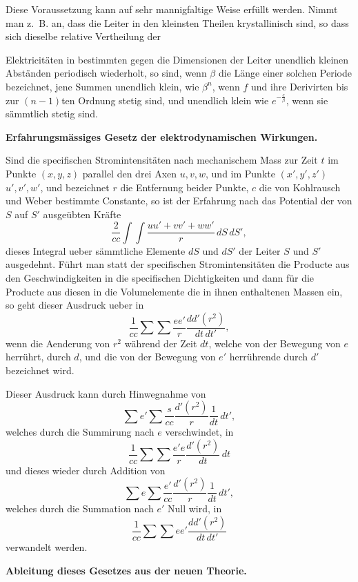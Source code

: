 \documentclass[12pt,a4paper]{article}
\begin{document}
Diese Voraussetzung kann auf sehr mannigfaltige Weise erf\"ullt werden. Nimmt man z.~B. an, dass die Leiter in den kleinsten Theilen krystallinisch sind, so dass sich dieselbe relative Vertheilung der

\newpage
\noindent Elektricit\"aten in bestimmten gegen die Dimensionen der Leiter unendlich kleinen Abst\"anden periodisch wiederholt, so sind, wenn $\beta$ die L\"ange einer solchen Periode bezeichnet, jene Summen unendlich klein, wie $\beta^{n}$, wenn $f$ und ihre Derivirten bis zur $(n-1)$ten Ordnung stetig sind, und unendlich klein wie $e^{-\frac{c}{\beta}}$, wenn sie s\"ammtlich stetig sind.

\medskip
\noindent\textbf{Erfahrungsm\"assiges Gesetz der elektrodynamischen Wirkungen.}

Sind die specifischen Stromintensit\"aten nach mechanischem Mass zur Zeit $t$ im Punkte $(x,y,z)$ parallel den drei Axen $u,v,w$, und im Punkte $(x',y',z')$ $u',v',w'$, und bezeichnet $r$ die Entfernung beider Punkte, $c$ die von Kohlrausch und Weber bestimmte Constante, so ist der Erfahrung nach das Potential der von $S$ auf $S'$ ausge\"ubten Kr\"afte
\[\frac{2}{cc} \int\!\int \frac{uu' + vv' + ww'}{r}\, dS\, dS',\]
dieses Integral ueber s\"ammtliche Elemente $dS$ und $dS'$ der Leiter $S$ und $S'$ ausgedehnt. F\"uhrt man statt der specifischen Stromintensit\"aten die Producte aus den Geschwindigkeiten in die specifischen Dichtigkeiten und dann f\"ur die Producte aus diesen in die Volumelemente die in ihnen enthaltenen Massen ein, so geht dieser Ausdruck ueber in
\[\frac{1}{cc} \sum\sum \frac{ee'}{r} \frac{d d'(r^{2})}{dt\,dt'},\]
wenn die Aenderung von $r^{2}$ w\"ahrend der Zeit $dt$, welche von der Bewegung von $e$ herr\"uhrt, durch $d$, und die von der Bewegung von $e'$ herr\"uhrende durch $d'$ bezeichnet wird.

Dieser Ausdruck kann durch Hinwegnahme von
\[\sum e' \sum \frac{s}{cc} \frac{d'(r^{2})}{r} \frac{1}{dt}\, dt',\]
welches durch die Summirung nach $e$ verschwindet, in
\[\frac{1}{cc} \sum\sum \frac{e'e}{r} \frac{d'(r^{2})}{dt}\, dt\]
und dieses wieder durch Addition von
\[\sum e \sum \frac{e'}{cc} \frac{d'(r^{2})}{r} \frac{1}{dt}\, dt',\]
welches durch die Summation nach $e'$ Null wird, in
\[\frac{1}{cc} \sum\sum ee' \frac{dd'(r^{2})}{dt\, dt'}\]
verwandelt werden.

\medskip
\noindent\textbf{Ableitung dieses Gesetzes aus der neuen Theorie.}
\end{document}
